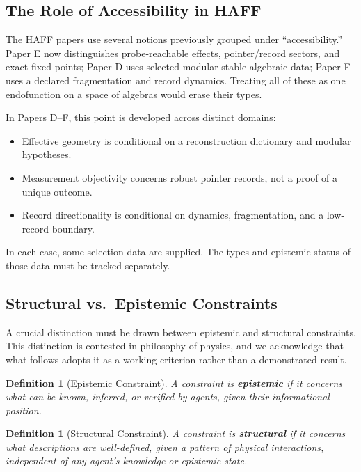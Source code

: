 \documentclass[12pt,a4paper]{article}
\newtheorem{definition}[theorem]{Definition}
\begin{document}
\subsection{The Role of Accessibility in HAFF}

The HAFF papers use several notions previously grouped under ``accessibility.''  Paper E now distinguishes probe-reachable effects, pointer/record sectors, and exact fixed points; Paper D uses selected modular-stable algebraic data; Paper F uses a declared fragmentation and record dynamics.  Treating all of these as one endofunction on a space of algebras would erase their types.

In Papers D--F, this point is developed across distinct domains:

\begin{itemize}
    \item Effective geometry is conditional on a reconstruction dictionary and modular hypotheses.
    \item Measurement objectivity concerns robust pointer records, not a proof of a unique outcome.
    \item Record directionality is conditional on dynamics, fragmentation, and a low-record boundary.
\end{itemize}

In each case, some selection data are supplied.  The types and epistemic status of those data must be tracked separately.

\subsection{Structural vs.\ Epistemic Constraints}

A crucial distinction must be drawn between epistemic and structural constraints. This distinction is contested in philosophy of physics, and we acknowledge that what follows adopts it as a working criterion rather than a demonstrated result.

\begin{definition}[Epistemic Constraint]
A constraint is \textbf{epistemic} if it concerns what can be known, inferred, or verified by agents, given their informational position.
\end{definition}

\begin{definition}[Structural Constraint]
A constraint is \textbf{structural} if it concerns what descriptions are well-defined, given a pattern of physical interactions, independent of any agent's knowledge or epistemic state.
\end{definition}
\end{document}
